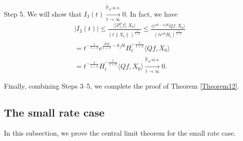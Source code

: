 \documentclass[12pt,a4paper]{amsart}
\theoremstyle{plain}
\theoremstyle{definition}
\numberwithin{equation}{section}
\begin{document}
	Step 5. We will show that $I_3(t) \xrightarrow[t\to \infty]{\tilde {\mathbb P}_\mu \text{-} a.s.} 0$.
In fact, we have
\begin{equation}\begin{split}
	&|I_3(t)|
\leq \frac{\langle |P^\alpha_tf|,X_0\rangle}{(t\|X_t\|)^{\frac{1}{1+\beta}}}
	\leq \frac{\langle e^{\alpha t - \kappa_f b t}Qf,X_0\rangle}{(te^{\alpha t} H_t)^{\frac{1}{1+\beta}}}
	\\& = t^{-\frac{1}{1+\beta}} e^{\frac{\beta \alpha t}{1+\beta} - k_fbt} H_t^{-\frac{1}{1+\beta}} \langle Qf,X_0\rangle
	\\& = t^{-\frac{1}{1+\beta}} H_t^{-\frac{1}{1+\beta}} \langle Qf,X_0\rangle
	\xrightarrow[t\to \infty]{\tilde {\mathbb P}_\mu \text{-} a.s.} 0.
\end{split}\end{equation}

	Finally, combining Steps 3--5, we complete the proof of Theorem \ref{Theorem12}.

\subsection{The small rate case}

 In this subsection, we prove the central limit theorem for the small rate case.
\end{document}
